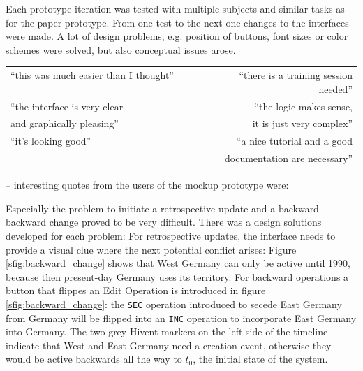 Each prototype iteration was tested with multiple subjects and similar tasks as for the paper prototype. From one test to the next one changes to the interfaces were made. A lot of design problems, e.g. position of buttons, font sizes or color schemes were solved, but also conceptual issues arose.

\begin{quoteit}
  \begin{tabular}{l r}
    ``this was much easier than I thought'' ~~~~~~~~ &
    ``there is a training session needed'' \\[0.5em]
    ``the interface is very clear &
    ``the logic makes sense, \\
    and graphically pleasing'' &
    it is just very complex'' \\[0.5em]
    ``it's looking good'' &
    ``a nice tutorial and a good \\
    & documentation are necessary'' \\
  \end{tabular}
\end{quoteit}
\vspace{-1em}
\hfill -- interesting quotes from the users of the mockup prototype were:

Especially the problem to initiate a retrospective update and a backward backward change proved to be very difficult. There was a design solutions developed for each problem: For retrospective updates, the interface needs to provide a visual clue where the next potential conflict arises: Figure \ref{sfig:backward_change} shows that West Germany can only be active until 1990, because then present-day Germany uses its territory. For backward operations a button that flippes an Edit Operation  is introduced in figure \ref{sfig:backward_change}: the \texttt{SEC} operation introduced to secede East Germany from Germany will be flipped into an \texttt{INC} operation to incorporate East Germany into Germany. The two grey Hivent markers on the left side of the timeline indicate that West and East Germany need a creation event, otherwise they would be active backwards all the way to $t_0$, the initial state of the system.


